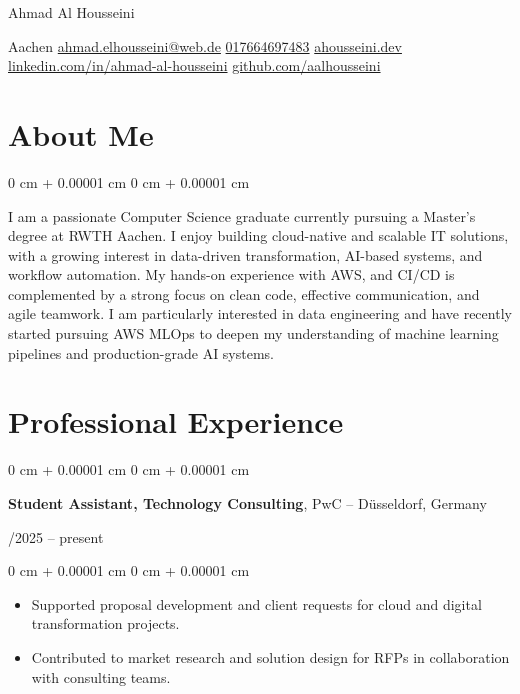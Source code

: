 \documentclass[10pt, letterpaper]{article}
\newenvironment{highlights}{
    \begin{itemize}[
        topsep=0.10 cm,
        parsep=0.10 cm,
        partopsep=0pt,
        itemsep=0pt,
        leftmargin=0 cm + 10pt
    ]
}{
    \end{itemize}
} %
\newenvironment{onecolentry}{
    \begin{adjustwidth}{
        0 cm + 0.00001 cm
    }{
        0 cm + 0.00001 cm
    }
}{
    \end{adjustwidth}
} %
\newenvironment{twocolentry}[2][]{
    \onecolentry
    \def\secondColumn{#2}
    \setcolumnwidth{\fill, 4.5 cm}
    \begin{paracol}{2}
}{
    \switchcolumn \raggedleft \secondColumn
    \end{paracol}
    \endonecolentry
} %
\newenvironment{header}{
    \setlength{\topsep}{0pt}\par\kern\topsep\centering\linespread{1.5}
}{
    \par\kern\topsep
} %
\begin{document}
    \newcommand{\AND}{\unskip
        \cleaders\copy\ANDbox\hskip\wd\ANDbox
        \ignorespaces
    }
    \newsavebox\ANDbox
    \sbox\ANDbox{$|$}

\begin{header}
    \fontsize{25 pt}{25 pt}\selectfont Ahmad Al Housseini

    \vspace{5 pt}

    \normalsize
    Aachen%
    \kern 5pt%
    \textbar\kern 5pt%
    \href{mailto:ahmad.elhousseini@web.de}{ahmad.elhousseini@web.de}%
    \kern 5pt%
    \textbar\kern 5pt%
    \href{tel:+4917664697483}{017664697483}%
    \kern 5pt%
    \textbar\kern 5pt%
    \href{https://ahousseini.dev/}{ahousseini.dev}%
    \kern 5pt%
    \textbar\kern 5pt%
    \href{https://linkedin.com/in/ahmad-al-housseini/}{linkedin.com/in/ahmad-al-housseini}%
    \kern 5pt%
    \textbar\kern 5pt%
    \href{https://github.com/aalhousseini}{github.com/aalhousseini}
\end{header}


    \vspace{5 pt - 0.3 cm}


\section{About Me}

\begin{onecolentry}
I am a passionate Computer Science graduate currently pursuing a Master’s degree at RWTH Aachen. I enjoy building cloud-native and scalable IT solutions, with a growing interest in data-driven transformation, AI-based systems, and workflow automation. My hands-on experience with AWS, and CI/CD is complemented by a strong focus on clean code, effective communication, and agile teamwork. I am particularly interested in data engineering and have recently started pursuing AWS MLOps to deepen my understanding of machine learning pipelines and production-grade AI systems.
\end{onecolentry}
    

    \section{Professional Experience}
    \begin{twocolentry}{
         10/2025 – present
    }
\textbf{ Student Assistant, Technology Consulting}, PwC -- Düsseldorf, Germany
\end{twocolentry}
\begin{onecolentry}
\begin{highlights}
    \item Supported proposal development and client requests for cloud and digital transformation projects.  
    \item Contributed to market research and solution design for RFPs in collaboration with consulting teams.  
\end{highlights}
\end{onecolentry}
\end{document}
